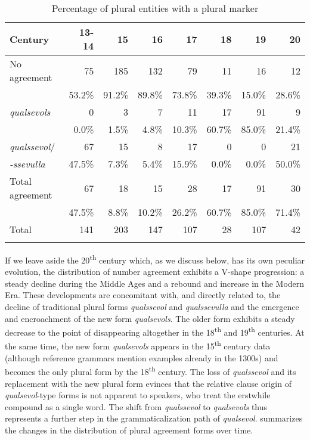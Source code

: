\documentclass[output=paper,colorlinks,citecolor=brown]{langscibook}
\begin{document}
\begin{table}
    \begin{tabularx}{\textwidth}{Qrrrrrrr} 
    \lsptoprule
    Century & 13-14 & 15 & 16 & 17 & 18 & 19 & 20 \\
     \midrule
     {No agreement} & 75 & 185 & 132 & 79 & 11 & 16	& 12 \\
     & 53.2\% & 91.2\%	& 89.8\% & 73.8\% & 39.3\% & 15.0\% & 28.6\%  \\
     \tablevspace
    \textit{qualsevols} & 0 & 3 & 7 & 11 & 17 & 91 & 9  \\
     & 0.0\% & 1.5\% & 4.8\% & 10.3\% & 60.7\% & 85.0\% & 21.4\% \\
      \tablevspace
     \textit{qualssevol}/ & 67 & 15 & 8 & 17 & 0 & 0 & 21 \\
     \textit{-ssevulla} & 47.5\% & 7.3\% & 5.4\% & 15.9\% & 0.0\% & 0.0\% & 50.0\%\\
     \tablevspace
     {Total agreement} & 67 & 18 & 15 & 28 & 17 & 91 & 30 \\ 
     & 47.5\% & 8.8\% & 10.2\% & 26.2\% & 60.7\% & 85.0\% & 71.4\% \\
     \midrule
     Total & 141 & 203 & 147 & 107 & 28	& 107 & 42\\
    \lspbottomrule
    \end{tabularx}
    \caption{Percentage of plural entities with a plural marker}
    \label{tab:ka4}
\end{table}    


If we leave aside the 20\textsuperscript{th} century which, as we discuss below, has its own peculiar evolution, the distribution of number agreement exhibits a V-shape progression: a steady decline during the Middle Ages and a rebound and increase in the Modern Era. These developments are concomitant with, and directly related to, the decline of traditional plural forms \textit{qualssevol} and \textit{qualssevulla} and the emergence and encroachment of the new form \textit{qualsevols}. The older form exhibits a steady decrease to the point of disappearing altogether in the 18\textsuperscript{th} and 19\textsuperscript{th} centuries. At the same time, the new form \textit{qualsevols} appears in the 15\textsuperscript{th} century data (although reference grammars mention examples already in the 1300s) and becomes the only plural form by the 18\textsuperscript{th} century. The loss of \textit{qualssevol} and its replacement with the new plural form evinces that the relative clause origin of \textit{qualsevol}-type forms is not apparent to speakers, who treat the erstwhile compound as a single word. The shift from \textit{qualssevol} to \textit{qualsevols} thus represents a further step in the grammaticalization path of \textit{qualsevol}.  summarizes the changes in the distribution of plural agreement forms over time.
\end{document}
